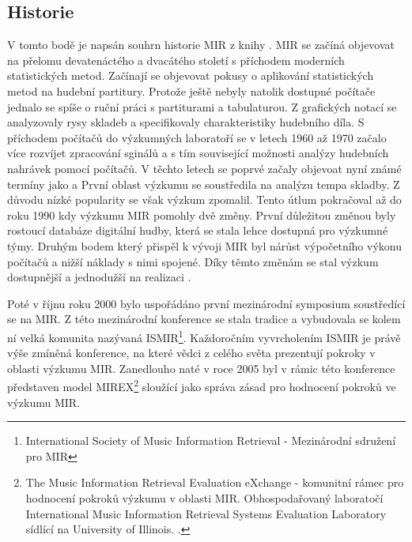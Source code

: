     \subsection{Historie}
    V tomto bodě je napsán souhrn historie MIR z knihy \cite{a_new_companion_to_digital_humanities}.
    \acs{MIR} se začíná objevovat na přelomu devatenáctého a dvacátého století s příchodem moderních statistických metod.
    Začínají se objevovat pokusy o aplikování statistických metod na hudební partitury.
    Protože ještě nebyly natolik dostupné počítače jednalo se spíše o ruční práci s partiturami a tabulaturou.
    Z grafických notací se analyzovaly rysy skladeb a specifikovaly charakteristiky hudebního díla.
    S příchodem počítačů do výzkumných laboratoří se v letech 1960 až 1970 začalo více rozvíjet zpracování sginálů a s tím související možnosti analýzy hudebních nahrávek pomocí počítačů.
    V těchto letech se poprvé začaly objevoat nyní známé termíny jako  a 
    První oblast výzkumu se soustředila na analýzu tempa skladby. Z důvodu nízké popularity se však výzkum zpomalil.
    Tento útlum pokračoval až do roku 1990 kdy výzkumu \acs{MIR} pomohly dvě změny.
    První důležitou změnou byly rostoucí databáze digitální hudby, která se stala lehce dostupná pro výzkumné týmy.
    Druhým bodem který přispěl k vývoji \acs{MIR} byl nárůst výpočetního výkonu počítačů a nižší náklady s nimi spojené.
    Díky těmto změnám se stal výzkum dostupnější a jednodužší na realizaci \cite{a_new_companion_to_digital_humanities}.

    Poté v říjnu roku 2000 bylo uspořádáno první mezinárodní symposium soustředící se na \acs{MIR}.
    Z této mezinárodní konference se stala tradice a vybudovala se kolem ní velká komunita nazývaná \acs{ISMIR}\footnote{International Society of Music Information Retrieval - Mezinárodní sdružení pro \acs{MIR}}.
    Každoročním vyvrcholením \acs{ISMIR} je právě výše zmíněná konference, na které vědci z celého světa prezentují pokroky v oblasti výzkumu \acs{MIR}.
    Zanedlouho naté v roce 2005 byl v rámic této konference představen model \acs{MIREX}\footnote{The Music Information Retrieval Evaluation eXchange - komunitní rámec pro hodnocení pokroků výzkumu v oblasti \acs{MIR}.
    Obhospodařovaný laboratočí International Music Information Retrieval Systems Evaluation Laboratory sídlící na University of Illinois.  \cite{Downie2010}.}
    sloužící jako správa zásad pro hodnocení pokroků ve výzkumu \acs{MIR}\cite{Downie2010}.
    
